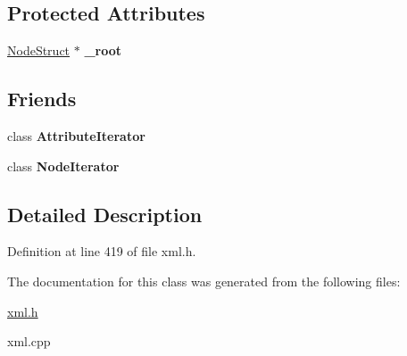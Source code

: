 \subsection*{Protected Attributes}
\begin{DoxyCompactItemize}
\item 
\hypertarget{classphys_1_1xml_1_1Node_ae76db7e7025e29af83e487cf4b270424}{
\hyperlink{structphys_1_1xml_1_1NodeStruct}{NodeStruct} $\ast$ {\bfseries \_\-root}}
\label{d7/d0a/classphys_1_1xml_1_1Node_ae76db7e7025e29af83e487cf4b270424}

\end{DoxyCompactItemize}
\subsection*{Friends}
\begin{DoxyCompactItemize}
\item 
\hypertarget{classphys_1_1xml_1_1Node_a1ed8790083a80b2604beba1c666bce6e}{
class {\bfseries AttributeIterator}}
\label{d7/d0a/classphys_1_1xml_1_1Node_a1ed8790083a80b2604beba1c666bce6e}

\item 
\hypertarget{classphys_1_1xml_1_1Node_ac5a1d2c6036b7ba1894a7c3b8d96a312}{
class {\bfseries NodeIterator}}
\label{d7/d0a/classphys_1_1xml_1_1Node_ac5a1d2c6036b7ba1894a7c3b8d96a312}

\end{DoxyCompactItemize}


\subsection{Detailed Description}


Definition at line 419 of file xml.h.



The documentation for this class was generated from the following files:\begin{DoxyCompactItemize}
\item 
\hyperlink{xml_8h}{xml.h}\item 
xml.cpp\end{DoxyCompactItemize}
